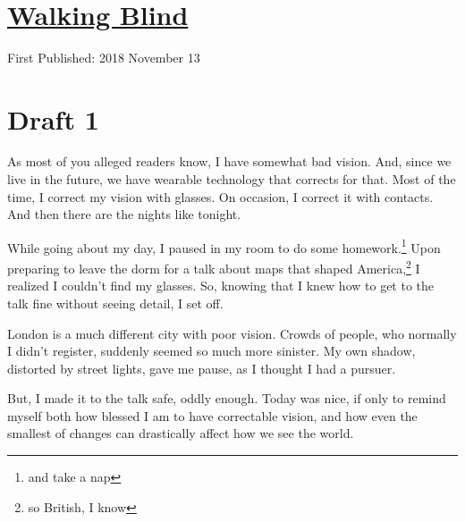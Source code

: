 \documentclass[12pt]{article}[titlepage]
\newcommand{\1}{\={a}}
\newcommand{\2}{\={e}}
\newcommand{\3}{\={\i}}
\newcommand{\4}{\=o}
\newcommand{\5}{\=u}
\newcommand{\6}{\={A}}
\renewcommand{\,}{\textsuperscript{,}}
\begin{document}

\doublespacing
\section{\href{walking-blind.html}{Walking Blind}}
First Published: 2018 November 13

\section{Draft 1}
As most of you alleged readers know, I have somewhat bad vision.
And, since we live in the future, we have wearable technology that corrects for that.
Most of the time, I correct my vision with glasses.
On occasion, I correct it with contacts.
And then there are the nights like tonight.

While going about my day, I paused in my room to do some homework.\footnote{and take a nap}
Upon preparing to leave the dorm for a talk about maps that shaped America,\footnote{so British, I know} I realized I couldn't find my glasses.
So, knowing that I knew how to get to the talk fine without seeing detail, I set off.

London is a much different city with poor vision.
Crowds of people, who normally I didn't register, suddenly seemed so much more sinister.
My own shadow, distorted by street lights, gave me pause, as I thought I had a pursuer.

But, I made it to the talk safe, oddly enough.
Today was nice, if only to remind myself both how blessed I am to have correctable vision, and how even the smallest of changes can drastically affect how we see the world.
\end{document}
